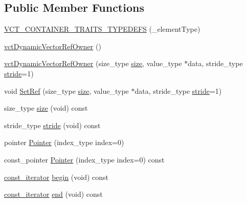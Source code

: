 \subsection*{Public Member Functions}
\begin{DoxyCompactItemize}
\item 
\hyperlink{classvct_dynamic_vector_ref_owner_a0dcf109a04e97737870516ec90241fcf}{V\+C\+T\+\_\+\+C\+O\+N\+T\+A\+I\+N\+E\+R\+\_\+\+T\+R\+A\+I\+T\+S\+\_\+\+T\+Y\+P\+E\+D\+E\+F\+S} (\+\_\+element\+Type)
\item 
\hyperlink{classvct_dynamic_vector_ref_owner_a2e1c4cccbc47183fea304b97c82d525a}{vct\+Dynamic\+Vector\+Ref\+Owner} ()
\item 
\hyperlink{classvct_dynamic_vector_ref_owner_ab23c1094dffd09bdfde6982fe855f06a}{vct\+Dynamic\+Vector\+Ref\+Owner} (size\+\_\+type \hyperlink{classvct_dynamic_vector_ref_owner_ae36ab3c8ce367ccb7cf4b0df5d0d7689}{size}, value\+\_\+type $\ast$data, stride\+\_\+type \hyperlink{classvct_dynamic_vector_ref_owner_a0d40824e0d32fe8774fec9ced242a090}{stride}=1)
\item 
void \hyperlink{classvct_dynamic_vector_ref_owner_af71e199d627c5b316f57f24b8025d3cb}{Set\+Ref} (size\+\_\+type \hyperlink{classvct_dynamic_vector_ref_owner_ae36ab3c8ce367ccb7cf4b0df5d0d7689}{size}, value\+\_\+type $\ast$data, stride\+\_\+type \hyperlink{classvct_dynamic_vector_ref_owner_a0d40824e0d32fe8774fec9ced242a090}{stride}=1)
\item 
size\+\_\+type \hyperlink{classvct_dynamic_vector_ref_owner_ae36ab3c8ce367ccb7cf4b0df5d0d7689}{size} (void) const 
\item 
stride\+\_\+type \hyperlink{classvct_dynamic_vector_ref_owner_a0d40824e0d32fe8774fec9ced242a090}{stride} (void) const 
\item 
pointer \hyperlink{classvct_dynamic_vector_ref_owner_a06f1235818043a3947c67d4d26b3d866}{Pointer} (index\+\_\+type index=0)
\item 
const\+\_\+pointer \hyperlink{classvct_dynamic_vector_ref_owner_af995ad4686900fcb5e8114bc2a05f7da}{Pointer} (index\+\_\+type index=0) const 
\item 
\hyperlink{classvct_dynamic_vector_ref_owner_a4f7a05e13925c0eeb1d5c754c3193ba0}{const\+\_\+iterator} \hyperlink{classvct_dynamic_vector_ref_owner_a9e6e7d0a1d2310ddc4402a6600f9f545}{begin} (void) const 
\item 
\hyperlink{classvct_dynamic_vector_ref_owner_a4f7a05e13925c0eeb1d5c754c3193ba0}{const\+\_\+iterator} \hyperlink{classvct_dynamic_vector_ref_owner_aebb70813d8757ad20415bb2d1a46624b}{end} (void) const 

\end{DoxyCompactItemize}
